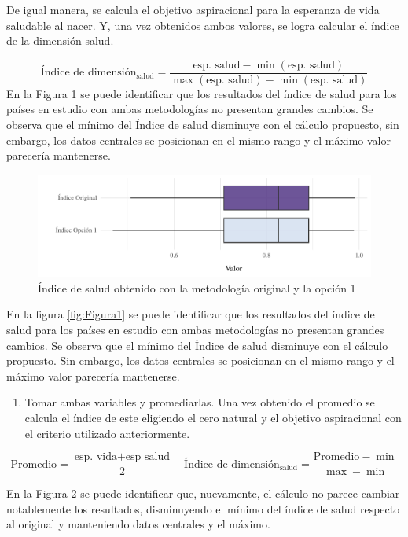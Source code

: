 \documentclass[
  10pt,
]{article}
\providecommand{\tightlist}{%
  \setlength{\itemsep}{0pt}\setlength{\parskip}{0pt}}
\begin{document}
De igual manera, se calcula el objetivo aspiracional para la esperanza
de vida saludable al nacer. Y, una vez obtenidos ambos valores, se logra
calcular el índice de la dimensión salud.

\[\text{Índice de dimensión}_{\text{salud}} = \frac{\text{esp. salud}-\min(\text{esp. salud})}{\max(\text{esp. salud})-\min(\text{esp. salud})}\]
En la Figura 1 se puede identificar que los resultados del índice de
salud para los países en estudio con ambas metodologías no presentan
grandes cambios. Se observa que el mínimo del Índice de salud disminuye
con el cálculo propuesto, sin embargo, los datos centrales se posicionan
en el mismo rango y el máximo valor parecería mantenerse.

\begin{figure}
\centering
\includegraphics{Informe_files/figure-latex/Figura1-1.pdf}
\caption{Índice de salud obtenido con la metodología original y la
opción 1}
\end{figure}

En la figura \ref{fig:Figura1} se puede identificar que los resultados
del índice de salud para los países en estudio con ambas metodologías no
presentan grandes cambios. Se observa que el mínimo del Índice de salud
disminuye con el cálculo propuesto. Sin embargo, los datos centrales se
posicionan en el mismo rango y el máximo valor parecería mantenerse.

\begin{enumerate}
\def\labelenumi{\arabic{enumi}.}
\setcounter{enumi}{1}
\tightlist
\item
  Tomar ambas variables y promediarlas. Una vez obtenido el promedio se
  calcula el índice de este eligiendo el cero natural y el objetivo
  aspiracional con el criterio utilizado anteriormente.
\end{enumerate}

\[\text{Promedio}=\frac{\text{esp. vida}+\text{esp salud}}{2} \quad \text{Índice de dimensión}_\text{salud} = \frac{\text{Promedio}-\min}{\max-\min}\]

En la Figura 2 se puede identificar que, nuevamente, el cálculo no
parece cambiar notablemente los resultados, disminuyendo el mínimo del
índice de salud respecto al original y manteniendo datos centrales y el
máximo.
\end{document}
